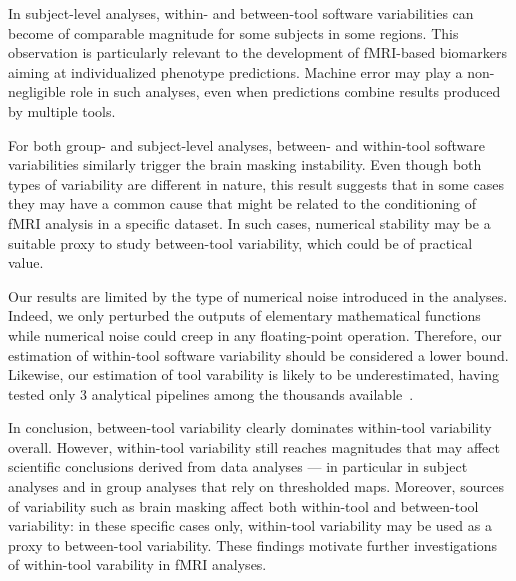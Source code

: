 In subject-level analyses, within- and between-tool software variabilities can become
of comparable magnitude for some subjects in some regions. This observation
is particularly relevant to the development of fMRI-based biomarkers aiming
at individualized phenotype predictions. Machine error may play
a non-negligible role in such analyses, even when predictions combine
results produced by multiple tools.

For both group- and subject-level analyses, between- and within-tool
software variabilities similarly trigger the brain masking instability.
Even though both types of variability are different in nature, this result
suggests that in some cases they may have a common cause that might be
related to the conditioning of fMRI analysis in a specific dataset. In such
cases, numerical stability may be a suitable proxy to study between-tool
variability, which could be of practical value.

Our results are limited by the type of numerical noise introduced in the
analyses. Indeed, we only perturbed the outputs of elementary
mathematical functions while numerical noise could creep in any
floating-point operation. Therefore, our estimation of within-tool software variability should
be considered a lower bound. Likewise, our estimation of tool varability is
likely to be underestimated, having tested only 3 analytical pipelines
among the thousands available~\cite{carp2012plurality}.

In conclusion, between-tool variability clearly dominates within-tool
variability overall. However, within-tool variability still reaches
magnitudes that may affect scientific conclusions derived from data
analyses --- in particular in subject analyses and in group analyses
that rely on thresholded maps. Moreover, sources of variability such as brain
masking affect both within-tool and between-tool
variability: in these specific cases only, within-tool variability may be
used as a proxy to between-tool variability. These findings motivate
further investigations of within-tool varability in fMRI analyses.


